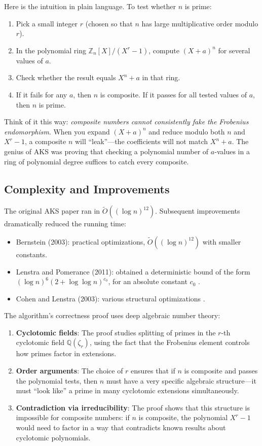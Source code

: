 Here is the intuition in plain language. To test whether $n$ is prime:

\begin{enumerate}
\item Pick a small integer $r$ (chosen so that $n$ has large multiplicative order modulo $r$).
\item In the polynomial ring $\mathbb{Z}_n[X] / (X^r - 1)$, compute $(X + a)^n$ for several values of $a$.
\item Check whether the result equals $X^n + a$ in that ring.
\item If it fails for any $a$, then $n$ is composite. If it passes for all tested values of $a$, then $n$ is prime.
\end{enumerate}

Think of it this way: \emph{composite numbers cannot consistently fake the Frobenius endomorphism}. When you expand $(X+a)^n$ and reduce modulo both $n$ and $X^r - 1$, a composite $n$ will ``leak''---the coefficients will not match $X^n + a$. The genius of AKS was proving that checking a polynomial number of $a$-values in a ring of polynomial degree suffices to catch every composite.

\subsection{Complexity and Improvements}

The original AKS paper ran in $\tilde{O}((\log n)^{12})$. Subsequent improvements dramatically reduced the running time:

\begin{itemize}
\item Bernstein (2003): practical optimizations, $\tilde{O}((\log n)^{12})$ with smaller constants.
\item Lenstra and Pomerance (2011): obtained a deterministic bound of the form $(\log n)^6(2+\log\log n)^{c_0}$, for an absolute constant $c_0$ \cite{lenstra2011}.
\item Cohen and Lenstra (2003): various structural optimizations \cite{bernstein2006}.
\end{itemize}

The algorithm's correctness proof uses deep algebraic number theory:

\begin{enumerate}
\item \textbf{Cyclotomic fields}: The proof studies splitting of primes in the $r$-th cyclotomic field $\mathbb{Q}(\zeta_r)$, using the fact that the Frobenius element controls how primes factor in extensions.
\item \textbf{Order arguments}: The choice of $r$ ensures that if $n$ is composite and passes the polynomial tests, then $n$ must have a very specific algebraic structure---it must ``look like'' a prime in many cyclotomic extensions simultaneously.
\item \textbf{Contradiction via irreducibility}: The proof shows that this structure is impossible for composite numbers: if $n$ is composite, the polynomial $X^r - 1$ would need to factor in a way that contradicts known results about cyclotomic polynomials.
\end{enumerate}

